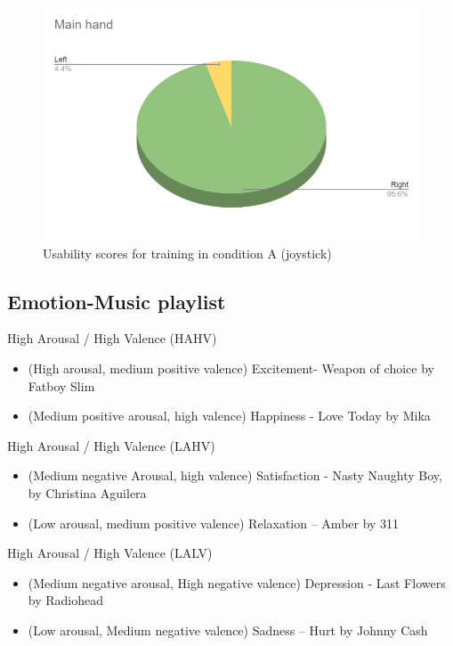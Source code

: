 \begin{figure}[!htb]
\includegraphics[width=14cm]{img/appendix/right_hand.png}
\centering
\caption{Usability scores for training in condition A (joystick)}\label{fig:usbility_condition_B}
\end{figure}

\subsection{Emotion-Music playlist}
\label{sec:appendix_A2.2}
High Arousal / High Valence (HAHV)
\begin{itemize}
\item  (High arousal, medium positive valence) Excitement- Weapon of choice by Fatboy Slim
\item  (Medium positive arousal, high valence) Happiness - Love Today by Mika
\end{itemize}

High Arousal / High Valence (LAHV)
\begin{itemize}
\item  (Medium negative Arousal, high valence) Satisfaction - Nasty Naughty Boy, by Christina Aguilera
\item 	 (Low arousal, medium positive valence) Relaxation – Amber by 311
\end{itemize}

High Arousal / High Valence (LALV)
\begin{itemize}
\item  (Medium negative arousal, High negative valence) Depression - Last Flowers by Radiohead
\item  (Low arousal, Medium negative valence) Sadness – Hurt by Johnny Cash
\end{itemize}

